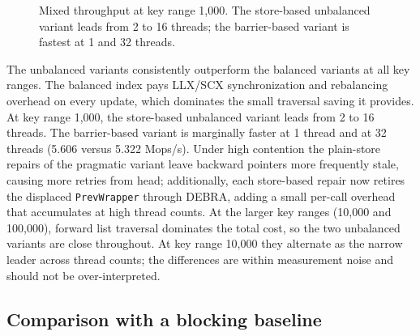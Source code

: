\documentclass[a4paper,11pt]{article}
\newcommand{\code}[1]{\texttt{#1}}
\begin{document}
\begin{figure}[H]
\centering
{}
\caption{Mixed throughput at key range 1,000. The store-based unbalanced variant leads from 2 to 16 threads; the barrier-based variant is fastest at 1 and 32 threads.}
\label{fig:mixed-1k}
\end{figure}

The unbalanced variants consistently outperform the balanced variants at all key ranges. The balanced index pays LLX/SCX synchronization and rebalancing overhead on every update, which dominates the small traversal saving it provides. At key range 1,000, the store-based unbalanced variant leads from 2 to 16 threads. The barrier-based variant is marginally faster at 1 thread and at 32 threads (5.606 versus 5.322 Mops/s). Under high contention the plain-store repairs of the pragmatic variant leave backward pointers more frequently stale, causing more retries from head; additionally, each store-based repair now retires the displaced \code{PrevWrapper} through DEBRA, adding a small per-call overhead that accumulates at high thread counts. At the larger key ranges (10,000 and 100,000), forward list traversal dominates the total cost, so the two unbalanced variants are close throughout. At key range 10,000 they alternate as the narrow leader across thread counts; the differences are within measurement noise and should not be over-interpreted.

\subsection{Comparison with a blocking baseline}
\end{document}
